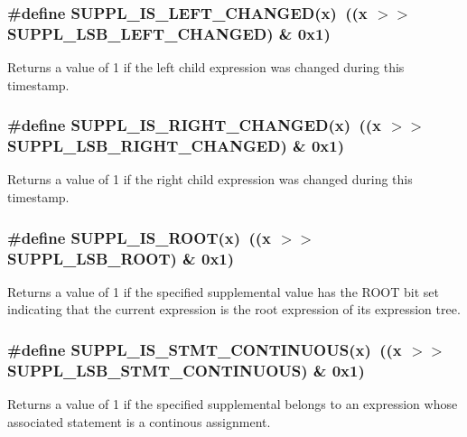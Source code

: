 \subsubsection{\setlength{\rightskip}{0pt plus 5cm}\#define SUPPL\_\-IS\_\-LEFT\_\-CHANGED(x)\ ((x $>$$>$ SUPPL\_\-LSB\_\-LEFT\_\-CHANGED) \& 0x1)}\label{group__expr__suppl_a30}


Returns a value of 1 if the left child expression was changed during this timestamp. 
\subsubsection{\setlength{\rightskip}{0pt plus 5cm}\#define SUPPL\_\-IS\_\-RIGHT\_\-CHANGED(x)\ ((x $>$$>$ SUPPL\_\-LSB\_\-RIGHT\_\-CHANGED) \& 0x1)}\label{group__expr__suppl_a31}


Returns a value of 1 if the right child expression was changed during this timestamp. 
\subsubsection{\setlength{\rightskip}{0pt plus 5cm}\#define SUPPL\_\-IS\_\-ROOT(x)\ ((x $>$$>$ SUPPL\_\-LSB\_\-ROOT) \& 0x1)}\label{group__expr__suppl_a21}


Returns a value of 1 if the specified supplemental value has the ROOT bit set indicating that the current expression is the root expression of its expression tree. 
\subsubsection{\setlength{\rightskip}{0pt plus 5cm}\#define SUPPL\_\-IS\_\-STMT\_\-CONTINUOUS(x)\ ((x $>$$>$ SUPPL\_\-LSB\_\-STMT\_\-CONTINUOUS) \& 0x1)}\label{group__expr__suppl_a25}


Returns a value of 1 if the specified supplemental belongs to an expression whose associated statement is a continous assignment. 
